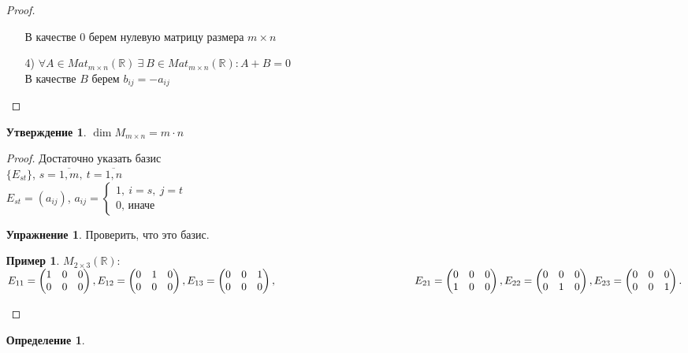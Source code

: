 \documentclass[a4paper, 12pt]{article}
\newcommand{\R}{\mathbb R}
\newcommand\tab[1][.5cm]{\hspace*{#1}}
\theoremstyle{definition}
\newtheorem*{definition}{Определение}
\newtheorem*{subtheorem}{Утверждение}
\newtheorem*{example1}{Пример}
\newtheorem*{Exercise}{Упражнение}
\begin{document}
\begin{enumerate}
\begin{proof}
\begin{itemize}
        В качестве 0 берем нулевую матрицу размера $m \times n$
        \item[4)] $\forall A \in Mat_{m \times n}(\R) \ \exists \ B \in Mat_{m \times n}(\R): A+B=0$ \\В качестве $B$ берем $b_{ij} = -a_{ij}$ 
      \end{itemize}
    \end{proof} 
    \begin{subtheorem}
      $\dim M_{m \times n} = m \cdot n$
    \end{subtheorem} 
    \begin{proof}
      Достаточно указать базис \\ 
      $\{E_{st}\}$, $s = \overline{1,m}, \ t = \overline{1,n}$ \\
      $E_{st} = (a_{ij})$, $a_{ij} = \begin{cases}
        1, \ i=s, \ j=t \\ 0 \text{, иначе}
      \end{cases}$
      \begin{Exercise}
        Проверить, что это базис.
      \end{Exercise}
      \begin{example1}
        $M_{2 \times 3} (\R):$
        $E_{11} = \begin{pmatrix} 1&0&0 \\ 0&0&0 \end{pmatrix},
        E_{12} = \begin{pmatrix} 0&1&0 \\ 0&0&0 \end{pmatrix},
        E_{13} = \begin{pmatrix} 0&0&1 \\ 0&0&0 \end{pmatrix}, \\
       \tab[4.6cm] E_{21} = \begin{pmatrix} 0&0&0 \\ 1&0&0 \end{pmatrix},
        E_{22} = \begin{pmatrix} 0&0&0 \\ 0&1&0 \end{pmatrix},
        E_{23} = \begin{pmatrix} 0&0&0 \\ 0&0&1 \end{pmatrix}.$
      \end{example1}
    \end{proof} 
    \begin{definition}

\end{definition}
\end{enumerate}
\end{document}
